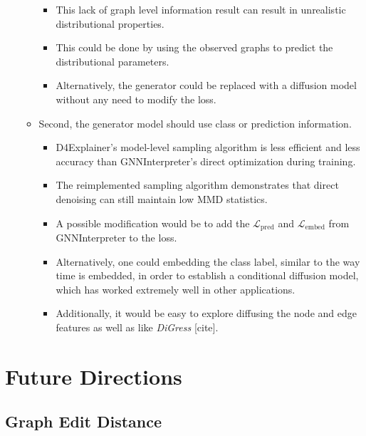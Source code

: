 \documentclass[
  11pt,
  letterpaper,
]{article}
\begin{document}
\begin{itemize}
\begin{itemize}
    \begin{itemize}
    \item
      This lack of graph level information result can result in
      unrealistic distributional properties.
    \item
      This could be done by using the observed graphs to predict the
      distributional parameters.
    \item
      Alternatively, the generator could be replaced with a diffusion
      model without any need to modify the loss.
    \end{itemize}
  \item
    Second, the generator model should use class or prediction
    information.

    \begin{itemize}
    \item
      D4Explainer's model-level sampling algorithm is less efficient and
      less accuracy than GNNInterpreter's direct optimization during
      training.
    \item
      The reimplemented sampling algorithm demonstrates that direct
      denoising can still maintain low MMD statistics.
    \item
      A possible modification would be to add the
      \(\mathcal{L}_\text{pred}\) and \(\mathcal{L}_\text{embed}\) from
      GNNInterpreter to the loss.
    \item
      Alternatively, one could embedding the class label, similar to the
      way time is embedded, in order to establish a conditional
      diffusion model, which has worked extremely well in other
      applications.
    \item
      Additionally, it would be easy to explore diffusing the node and
      edge features as well as like \emph{DiGress} {[}cite{]}.
    \end{itemize}
  \end{itemize}
\end{itemize}

\hypertarget{future-directions}{%
\section{Future Directions}\label{future-directions}}

\hypertarget{graph-edit-distance}{%
\subsection{Graph Edit Distance}\label{graph-edit-distance}}
\end{document}
